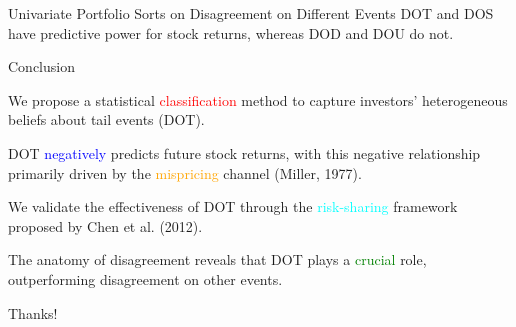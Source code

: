 \documentclass[11pt, aspectratio=169]{beamer}
\newenvironment{wideitemize}{\itemize\addtolength{\itemsep}{10pt}}{\enditemize}
\begin{document}
\begin{frame}{Univariate Portfolio Sorts on Disagreement on Different Events}
DOT and DOS have predictive power for stock returns, whereas DOD and DOU do not.\\
\bigskip
{}
\end{frame}

\begin{frame}{Conclusion}
\begin{wideitemize}
    \item We propose a statistical \textcolor{red}{classification} method to capture investors' heterogeneous beliefs about tail events (DOT).
    \item DOT \textcolor{blue}{negatively} predicts future stock returns, with this negative relationship primarily driven by the \textcolor{orange}{mispricing} channel (Miller, 1977).
    \item We validate the effectiveness of DOT through the \textcolor{cyan}{risk-sharing} framework proposed by Chen et al. (2012).
    \item The anatomy of disagreement reveals that DOT plays a \textcolor{green}{crucial} role, outperforming disagreement on other events.
\end{wideitemize}
\end{frame}

\begin{frame}
    \begin{center}
        {\Huge\calligra Thanks!}
    \end{center}
\end{frame}
\end{document}

